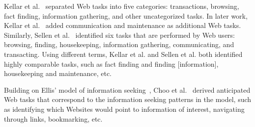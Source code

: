 \documentclass{sigchi}
\begin{document}
Kellar et al.~\cite{kellar2006goal} separated Web tasks into five categories: transactions, browsing, fact finding, information gathering, and other uncategorized tasks. In later work, Kellar et al.~\cite{kellar2007field} added communication and maintenance as additional Web tasks. Similarly, Sellen et al.~\cite{sellen2002knowledge} identified six tasks that are performed by Web users: browsing, finding, housekeeping, information gathering, communicating, and transacting. Using different terms, Kellar et al. and Sellen et al. both identified highly comparable tasks, such as fact finding and finding [information], housekeeping and maintenance, etc. 

Building on Ellis' model of information seeking~\cite{ellis1989behavioural,ellis1993comparison,ellis1997modelling}, Choo et al.~\cite{choo2000information} derived anticipated Web tasks that correspond to the information seeking patterns in the model, such as identifying which Websites would point to information of interest, navigating through links, bookmarking, etc.  
\end{document}
